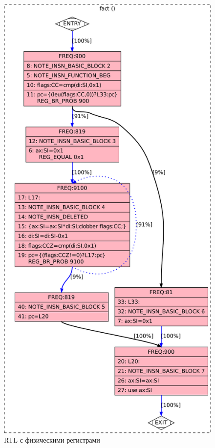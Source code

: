 \documentclass[a4paper,12pt,oneside]{article}
\begin{document}
\begin{figure}[htb]
\centering
\includegraphics[height=0.7\textheight]{illustrations/fact-reloaded-crop.pdf}
\caption{RTL с физическими регистрами}
\label{fig:fact_rtl_reload}
\end{figure}
\end{document}
